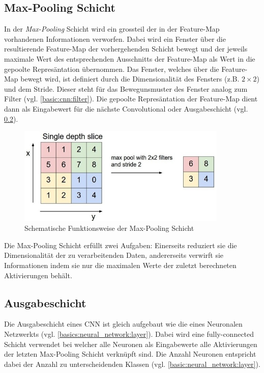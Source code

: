 \subsection{Max-Pooling Schicht}
\label{basic:cnn:pooling}
In der \emph{Max-Pooling} Schicht wird ein grossteil der in der Feature-Map vorhandenen Informationen verworfen. Dabei wird ein Fenster über die resultierende Feature-Map der vorhergehenden Schicht bewegt und der jeweils maximale Wert des entsprechenden Ausschnitts der Feature-Map als Wert in die gepoolte Represäntation übernommen. Das Fenster, welches über die Feature-Map bewegt wird, ist definiert durch die Dimensionalität des Fensters (z.B. $2\times 2$) und dem Stride. Dieser steht für das Bewegunsmuster des Fenster analog zum Filter (vgl. \ref{basic:cnn:filter}). Die gepoolte Represäntation der Feature-Map dient dann als Eingabewert für die nächste Convolutional oder Ausgabeschicht (vgl. \ref{basic:cnn:output_layer}).
\begin{figure}[H]
	\centering
	\includegraphics[width=10cm]{img/max_pooling}
	\caption{Schematische Funktionsweise der Max-Pooling Schicht}
\end{figure}
Die Max-Pooling Schicht erfüllt zwei Aufgaben: Einerseits reduziert sie die Dimensionalität der zu verarbeitenden Daten, andererseits verwirft sie  Informationen indem sie nur die maximalen Werte der zuletzt berechneten Aktivierungen behält.

\subsection{Ausgabeschicht}
\label{basic:cnn:output_layer}
Die Ausgabeschicht eines CNN ist gleich aufgebaut wie die eines  Neuronalen Netzwerkts (vgl. \ref{basics:neural_network:layer}). Dabei wird eine fully-connected Schicht verwendet bei welcher alle Neuronen als Eingabewerte alle Aktivierungen der letzten Max-Pooling Schicht verknüpft sind. Die Anzahl Neuronen entspricht dabei der Anzahl zu unterscheidenden Klassen (vgl. \ref{basic:neural_network:layer}).
